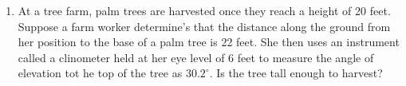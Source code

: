 \begin{enumerate}
\item At a tree farm, palm trees are harvested once they reach a height of 20 feet.  Suppose a farm worker determine's that the distance along the ground from her position to the base of a palm tree is 22 feet.  She then uses an instrument called a clinometer held at her eye level of 6 feet to measure the angle of elevation tot he top of the tree as $30.2^\circ$.  Is the tree tall enough to harvest?\vfill
%
%
\end{enumerate}

